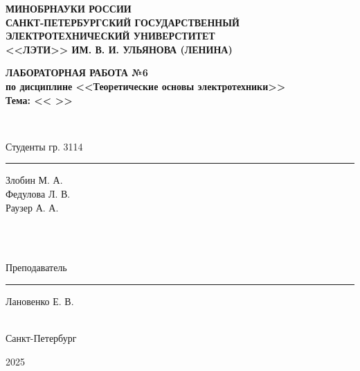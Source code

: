 \documentclass[a4paper,14pt ]{article} %
\begin{document}
 
\begin{titlepage}
    \begin{center}
        {\bf  МИНОБРНАУКИ РОССИИ\\
        САНКТ-ПЕТЕРБУРГСКИЙ ГОСУДАРСТВЕННЫЙ\\
        ЭЛЕКТРОТЕХНИЧЕСКИЙ УНИВЕРСТИТЕТ\\
        <<ЛЭТИ>> ИМ. В. И. УЛЬЯНОВА (ЛЕНИНА)\\
    
        }
    \end{center}
    \vfill
        {
        \begin{center}
            \bfseries
            ЛАБОРАТОРНАЯ РАБОТА №6\\
            по дисциплине <<Теоретические основы электротехники>>\\
            Тема: << 
            >>\\
        \end{center}
        }
        \
    \vfill
        {\noindent\parbox{4cm}{Студенты гр. 3114}  \hfill \parbox{3cm}{\rule{3cm}{0.15mm}} \hfill \parbox{4cm}{\raggedleft Злобин М. А.\\ Федулова Л. В. \\ Раузер А. А.}} \\\\
        \parbox{4cm}{Преподаватель} \hfill \parbox{3cm}{\rule{3cm}{0.15mm}} \hfill \parbox{4cm}{\raggedleft Лановенко Е. В.} \\ 
        \center Санкт-Петербург
        
        2025
\end{titlepage}
\end{document}
